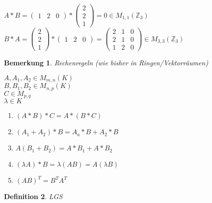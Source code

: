 \documentclass[a4paper,11pt]{article}
\newtheorem{definition}{Definition}[section]
\newtheorem{bem}[definition]{Bemerkung}
\begin{document}
\begin{enumerate}[label=\alph*)]
$A*B=\begin{pmatrix}1&2&0\end{pmatrix}*\begin{pmatrix}2\\2\\1\end{pmatrix}=0\in M_{1,1}(\mathbb{Z}_3)$ \\
$B*A=\begin{pmatrix}2\\2\\1\end{pmatrix}*\begin{pmatrix}1&2&0\end{pmatrix}=\begin{pmatrix}2&1&0\\2&1&0\\1&2&0\end{pmatrix}\in M_{3,3}(\mathbb{Z}_3)$ 
\end{enumerate}
\begin{bem}
Rechenregeln (wie bisher in Ringen/Vektorräumen)
\end{bem}
$A,A_1,A_2\in M_{m,n}(K)$ \\
$B,B_1,B_2\in M_{n,p}(K)$ \\
$C\in M_{p,q}$ \\
$\lambda\in K$
\begin{enumerate}[label=\alph*)]
\item $(A*B)*C=A*(B*C)$
\item $(A_1+A_2)*B=A_a*B+A_2*B$
\item $A(B_1+B_2)=A*B_1+A*B_2$
\item $(\lambda A)*B=\lambda(AB)=A(\lambda B)$
\item $(AB)^T=B^TA^T$
\end{enumerate}
\newpage
\begin{definition}
LGS
\end{definition}
\end{document}
